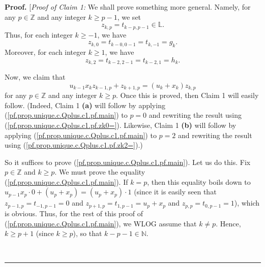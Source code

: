 \documentclass[numbers=enddot,12pt,final,onecolumn,notitlepage]{scrartcl}%
\theoremstyle{definition}
\newenvironment{proof}[1][Proof]{\noindent\textbf{#1.} }{\ \rule{0.5em}{0.5em}}
\newenvironment{verlong}{}{}
\begin{document}
\begin{verlong}
\begin{proof}
[\textit{Proof of Claim 1:} We shall prove something more general. Namely, for
any $p\in\mathbb{Z}$ and any integer $k\geq p-1$, we set%
\begin{equation}
z_{k,p}=t_{k-p,p-1}\in\mathbb{L}. \label{pf.prop.unique.c.Qplus.c1.pf.zkp=}%
\end{equation}
Thus, for each integer $k\geq-1$, we have
\begin{equation}
z_{k,0}=t_{k-0,0-1}=t_{k,-1}=g_{k}. \label{pf.prop.unique.c.Qplus.c1.pf.zk0=}%
\end{equation}
Moreover, for each integer $k\geq1$, we have%
\begin{equation}
z_{k,2}=t_{k-2,2-1}=t_{k-2,1}=h_{k}. \label{pf.prop.unique.c.Qplus.c1.pf.zk2=}%
\end{equation}


Now, we claim that%
\begin{equation}
u_{k-1}x_{k}z_{k-1,p}+z_{k+1,p}=\left(  u_{k}+x_{k}\right)  z_{k,p}
\label{pf.prop.unique.c.Qplus.c1.pf.main}%
\end{equation}
for any $p\in\mathbb{Z}$ and any integer $k\geq p$. Once this is proved, then
Claim 1 will easily follow. (Indeed, Claim 1 \textbf{(a)} will follow by
applying (\ref{pf.prop.unique.c.Qplus.c1.pf.main}) to $p=0$ and rewriting the
result using (\ref{pf.prop.unique.c.Qplus.c1.pf.zk0=}). Likewise, Claim 1
\textbf{(b)} will follow by applying (\ref{pf.prop.unique.c.Qplus.c1.pf.main})
to $p=2$ and rewriting the result using
(\ref{pf.prop.unique.c.Qplus.c1.pf.zk2=}).)

So it suffices to prove (\ref{pf.prop.unique.c.Qplus.c1.pf.main}). Let us do
this. Fix $p\in\mathbb{Z}$ and $k\geq p$. We must prove the equality
(\ref{pf.prop.unique.c.Qplus.c1.pf.main}). If $k=p$, then this equality boils
down to $u_{p-1}x_{p}\cdot0+\left(  u_{p}+x_{p}\right)  =\left(  u_{p}%
+x_{p}\right)  \cdot1$ (since it is easily seen that $z_{p-1,p}=t_{-1,p-1}=0$
and $z_{p+1,p}=t_{1,p-1}=u_{p}+x_{p}$ and $z_{p,p}=t_{0,p-1}=1$), which is
obvious. Thus, for the rest of this proof of
(\ref{pf.prop.unique.c.Qplus.c1.pf.main}), we WLOG assume that $k\neq p$.
Hence, $k\geq p+1$ (since $k\geq p$), so that $k-p-1\in\mathbb{N}$.


\end{proof}
\end{verlong}
\end{document}
